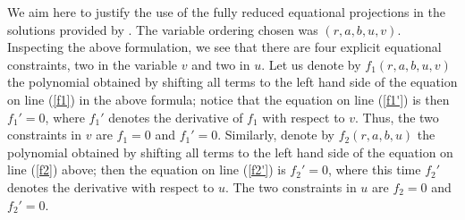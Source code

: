 \documentclass{article}
\begin{document}
We aim here to justify the use of the fully reduced equational projections
in the solutions provided by \cite{Collins1996, Collins1998}.
The variable ordering chosen was $(r,a,b,u,v)$.
Inspecting the above formulation, we see that there
are four explicit equational constraints, two in the variable $v$
and two in $u$. Let us denote by $f_1(r,a,b,u,v)$ the polynomial
obtained by shifting all terms to the left hand side of the equation
on line (\ref{f1}) in the above formula; notice that the
equation on line (\ref{f1'}) is then $f_1' = 0$, where $f_1'$ denotes
the derivative of $f_1$ with respect to $v$.
Thus, the two constraints in $v$ are $f_1 = 0$ and $f_1' = 0$.
Similarly, denote by $f_2(r,a,b,u)$ the polynomial obtained
by shifting all terms to the left hand side of the equation
on line (\ref{f2}) above; then the equation on line (\ref{f2'}) is $f_2' = 0$,
where this time $f_2'$ denotes the derivative with respect to $u$.
The two constraints in $u$ are $f_2 = 0$ and $f_2' = 0$.
\end{document}
